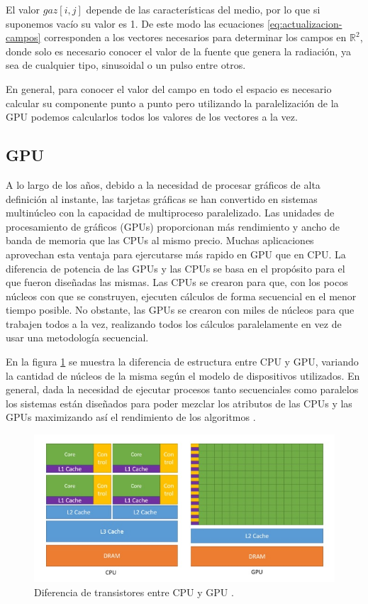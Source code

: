 \documentclass[11pt,a4paper,twoside,pdf]{article}
\numberwithin{equation}{section}
\begin{document}
El valor $gaz[i,j]$ depende de las características del medio, por lo que si suponemos vacío su valor es 1. De este modo las ecuaciones \eqref{eq:actualizacion-campos} corresponden a los vectores necesarios para determinar los campos en $\mathbb R^{2}$, donde solo es necesario conocer el valor de la fuente que genera la radiación, ya sea de cualquier tipo, sinusoidal o un pulso entre otros.  

En general, para conocer el valor del campo en todo el espacio es necesario calcular  su componente punto a punto pero utilizando la paralelización de la GPU podemos calcularlos todos los valores de los vectores a la vez.



\subsection{GPU} \label{subsection:GPU}

A lo largo de los años, debido a la necesidad de procesar gráficos de alta definición al instante, las tarjetas gráficas se han convertido en sistemas multinúcleo con la capacidad de multiproceso paralelizado. Las unidades de procesamiento de gráficos (GPUs) proporcionan más rendimiento y ancho de banda de memoria que las CPUs al mismo precio. Muchas aplicaciones aprovechan esta ventaja para ejercutarse más rapido en GPU que en CPU. La diferencia de potencia de las GPUs y las CPUs se basa en el propósito para el que fueron diseñadas las mismas. Las CPUs se crearon para que, con los pocos núcleos con que se construyen, ejecuten cálculos de forma secuencial en el menor tiempo posible. No obstante, las GPUs se crearon con miles de núcleos para que trabajen todos a la vez, realizando todos los cálculos paralelamente en vez de usar una metodología secuencial.

En la figura \ref{fig:arquitectura-cpu-gpu} se muestra la diferencia de estructura entre CPU y GPU, variando la cantidad de núcleos de la misma según el modelo de dispositivos utilizados. En general, dada la necesidad de ejecutar procesos tanto secuenciales como paralelos los sistemas están diseñados para poder mezclar los atributos de las CPUs y las GPUs maximizando así el rendimiento de los algoritmos \cite{web}.

\begin{figure}[h]
\centering
\includegraphics[width=15cm]{Nvidia-CPU-GPU.jpg}				
\caption{Diferencia de transistores entre CPU y GPU \cite{web}. }
\label{fig:arquitectura-cpu-gpu}
\end{figure}
\noindent
\end{document}
